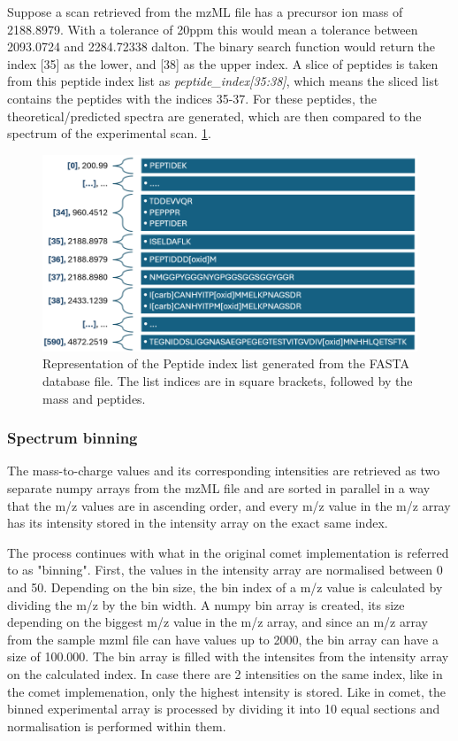 \documentclass[11pt]{article}
\begin{document}
Suppose a scan retrieved from the mzML file has a precursor ion mass of 2188.8979. With a tolerance of 20ppm this would mean a tolerance between 2093.0724 and 2284.72338 dalton. The binary search function would return the index [35] as the lower, and [38] as the upper index. A slice of peptides is taken  from this peptide index list as \textit{peptide\_index[35:38]}, which means the sliced list contains the peptides with the indices 35-37. For these peptides, the theoretical/predicted spectra are generated, which are then compared to the spectrum of the experimental scan.
\cref{fig:peptindex}.

\begin{figure}[ht]
\centering
\includegraphics[width=1\textwidth]{figs/pepindex.png}
\caption{Representation of the Peptide index list generated from the FASTA database file. The list indices are in square brackets, followed by the mass and peptides.}
\label{fig:peptindex}
\end{figure}

\subsubsection{Spectrum binning}
The mass-to-charge values and its corresponding intensities are retrieved as two separate numpy arrays from the mzML file and are sorted in parallel in a way that the m/z values are in ascending order, and every m/z value in the m/z array has its intensity stored in the intensity array on the exact same index.

The process continues with what in the original comet implementation is referred to as "binning". First, the values in the intensity array are normalised between 0 and 50. Depending on the bin size, the bin index of a m/z value is calculated by dividing the m/z by the bin width. A numpy bin array is created, its size depending on the biggest m/z value in the m/z array, and since an m/z array from the sample mzml file can have values up to 2000, the bin array can have a size of 100.000. The bin array is filled with the intensites from the intensity array on the calculated index. In case there are 2 intensities on the same index, like in the comet implemenation, only the highest intensity is stored. Like in comet, the binned experimental array is processed by dividing it into 10 equal sections and normalisation is performed within them.
\end{document}

